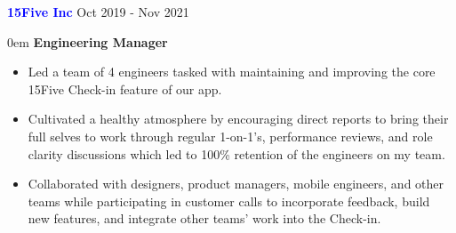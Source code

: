 \documentclass[11pt]{resume}
\begin{document}
    \noindent\begin{minipage}[t]{1\textwidth}
      {\bf \textcolor{blue} {\large{15Five Inc}}} \hfill Oct 2019 - Nov 2021
      \vspace{.25em}
      \begin{addmargin}[.5em]{0em}
        \large{\bf {Engineering Manager}}
        \vspace{-.5em}
        \begin{itemize}
            \setlength\itemsep{-.1em}
            \item {Led a team of 4 engineers tasked with maintaining and 
                  improving the core 15Five Check-in feature of our app.}
            \item {Cultivated a healthy atmosphere by encouraging direct
                  reports to bring their full selves to work through regular
                  1-on-1's, performance reviews, and role clarity discussions
                  which led to 100\% retention of the engineers on my team.}
            \item {Collaborated with designers, product managers, mobile
                  engineers, and other teams while participating in customer calls
                  to incorporate feedback, build new features, and integrate other
                  teams' work into the Check-in.}
        \end{itemize}
      \end{addmargin}
    \end{minipage}

    \vspace{1em}
\end{document}
